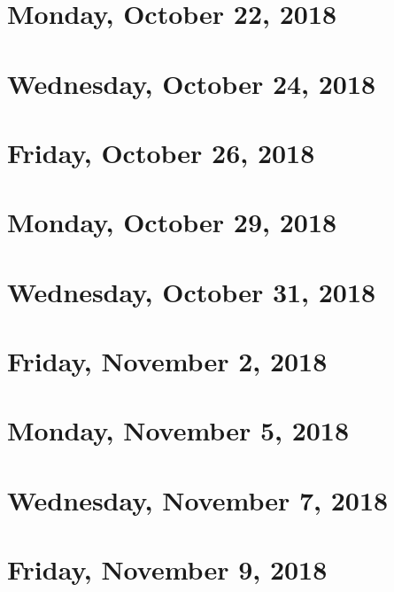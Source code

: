 \documentclass[reqno]{amsart}
\begin{document}
\section{Monday, October 22, 2018}
    
    
\section{Wednesday, October 24, 2018}
    

\section{Friday, October 26, 2018}
    

\section{Monday, October 29, 2018}
    
    
\section{Wednesday, October 31, 2018}
    

\section{Friday, November 2, 2018}
    

\section{Monday, November 5, 2018}
    
    
\section{Wednesday, November 7, 2018}
    

\section{Friday, November 9, 2018}
    
\end{document}
